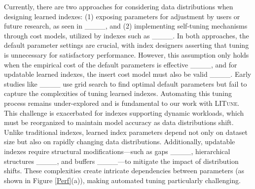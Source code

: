 Currently, there are two approaches for considering data distributions when designing learned indexes: (1) exposing parameters for adjustment by users or future research, as seen in ____, and (2) implementing self-tuning mechanisms through cost models, utilized by indexes such as ____. In both approaches, the default parameter settings are crucial, with index designers asserting that tuning is unnecessary for satisfactory performance. However, this assumption only holds when the empirical cost of the default parameters is effective ____, and for updatable learned indexes, the insert cost model must also be valid ____. Early studies like ____ use grid search to find optimal default parameters but fail to capture the complexities of tuning learned indexes. Automating this tuning process remains under-explored and is fundamental to our work with \textsc{LITune}. This challenge is exacerbated for indexes supporting dynamic workloads, which must be reorganized to maintain model accuracy as data distributions shift. Unlike traditional indexes, learned index parameters depend not only on dataset size but also on rapidly changing data distributions. Additionally, updatable indexes require structural modifications—such as gaps ____, hierarchical structures ____, and buffers ____—to mitigate the impact of distribution shifts. These complexities create intricate dependencies between parameters (as shown in Figure \ref{Perf}(a)), making automated tuning particularly challenging.







